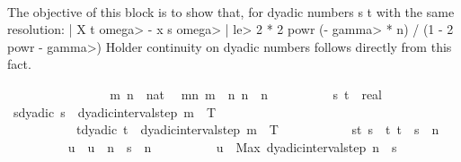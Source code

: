 \begin{isabellebody}
\ \ \ \ \ \ \isamarkupfalse%
%
\begin{isamarkuptext}%
The objective of this block is to show that, for dyadic numbers s t with the same resolution:
     | X t \<omega> - x s \<omega> | \<le> 2 * 2 powr (- \<gamma> * n) / (1 - 2 powr - \<gamma>)
    Holder continuity on dyadic numbers follows directly from this fact.%
\end{isamarkuptext}\isamarkuptrue%
\ \ \ \ \ \ \isacommand{{\isacharbraceleft}{\kern0pt}}\isamarkupfalse%
\isanewline
\ \ \ \ \ \ \ \ \isamarkupfalse%
\ m\ n\ {\isacharcolon}{\kern0pt}{\isacharcolon}{\kern0pt}\ nat\ \isamarkupfalse%
\ mn{\isacharcolon}{\kern0pt}\ {\isachardoublequoteopen}m\ {\isasymge}\ n{\isachardoublequoteclose}\ {\isachardoublequoteopen}n\ {\isasymge}\ n\isanewline
\ \ \ \ \ \ \ \ \isamarkupfalse%
\ s\ t\ {\isacharcolon}{\kern0pt}{\isacharcolon}{\kern0pt}\ real\ \isanewline
\ \ \ \ \ \ \ \ \ \ \isamarkupfalse%
\ s{\isacharunderscore}{\kern0pt}dyadic{\isacharcolon}{\kern0pt}\ {\isachardoublequoteopen}s\ {\isasymin}\ dyadic{\isacharunderscore}{\kern0pt}interval{\isacharunderscore}{\kern0pt}step\ m\ {}\ T{\isachardoublequoteclose}\isanewline
\ \ \ \ \ \ \ \ \ \ \ t{\isacharunderscore}{\kern0pt}dyadic{\isacharcolon}{\kern0pt}\ {\isachardoublequoteopen}t\ {\isasymin}\ dyadic{\isacharunderscore}{\kern0pt}interval{\isacharunderscore}{\kern0pt}step\ m\ {}\ T{\isachardoublequoteclose}\isanewline
\ \ \ \ \ \ \ \ \ \ \ st{\isacharcolon}{\kern0pt}\ {\isachardoublequoteopen}s\ {\isasymle}\ t{\isachardoublequoteclose}\ {\isachardoublequoteopen}t\ {\isacharminus}{\kern0pt}\ s\ {\isasymle}\ {}{\isacharslash}{\kern0pt}{}{\isacharcircum}{\kern0pt}n{\isachardoublequoteclose}\isanewline
\ \ \ \ \ \ \ \ \isamarkupfalse%
\ u\ \ {\isachardoublequoteopen}u\ {\isasymequiv}\ {\isasymlfloor}{}{\isacharcircum}{\kern0pt}n\ {\isacharasterisk}{\kern0pt}\ s{\isasymrfloor}\ {\isacharslash}{\kern0pt}\ {}{\isacharcircum}{\kern0pt}n{\isachardoublequoteclose}\isanewline
\ \ \ \ \ \ \ \ \isamarkupfalse%
\ {\isachardoublequoteopen}u\ {\isacharequal}{\kern0pt}\ Max\ {\isacharparenleft}{\kern0pt}dyadic{\isacharunderscore}{\kern0pt}interval{\isacharunderscore}{\kern0pt}step\ n\ {}\ s{\isacharparenright}{\kern0pt}{\isachardoublequoteclose}\isanewline
\ \ \ \ \ \ \ \ \ \ \isamarkupfalse%

\end{isabellebody}
